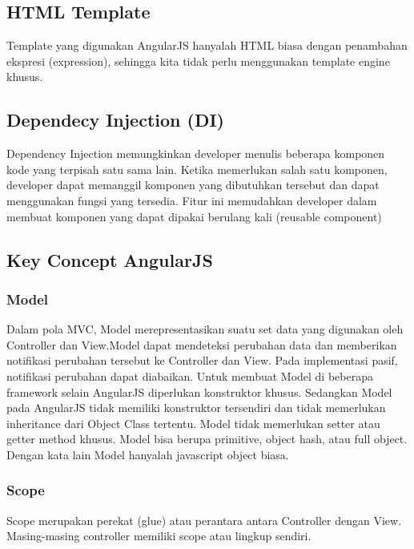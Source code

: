 \subsection{HTML Template}
\label{sub: HTMLTemplate}

	Template yang digunakan AngularJS hanyalah HTML biasa dengan penambahan ekspresi (expression), sehingga kita tidak perlu menggunakan template engine khusus.

\subsection{Dependecy Injection (DI)}
\label{sub: DI}

	Dependency Injection memungkinkan developer menulis beberapa komponen kode yang terpisah satu sama lain. Ketika memerlukan salah satu komponen, developer dapat memanggil komponen yang dibutuhkan tersebut dan dapat menggunakan fungsi yang tersedia. Fitur ini memudahkan developer dalam membuat komponen yang dapat dipakai berulang kali (reusable component)

\subsection{Key Concept AngularJS}
\label{sec: keyConceptAngularJS}

\subsubsection{Model}
\label{sub: model}

	Dalam pola MVC, Model merepresentasikan suatu set data yang digunakan oleh Controller dan View.Model dapat mendeteksi perubahan data dan memberikan notifikasi perubahan tersebut ke Controller dan View. Pada implementasi pasif, notifikasi perubahan dapat diabaikan. Untuk membuat Model di beberapa framework selain AngularJS diperlukan konstruktor khusus. Sedangkan Model pada AngularJS tidak memiliki konstruktor tersendiri dan tidak memerlukan inheritance dari Object Class tertentu. Model tidak memerlukan setter atau getter method khusus. Model bisa berupa primitive, object hash, atau full object. Dengan kata lain Model hanyalah javascript object biasa.

\subsubsection{Scope}
\label{sub: Scope}

	Scope merupakan perekat (glue) atau perantara antara Controller dengan View. Masing-masing controller memiliki scope atau lingkup sendiri.
	
